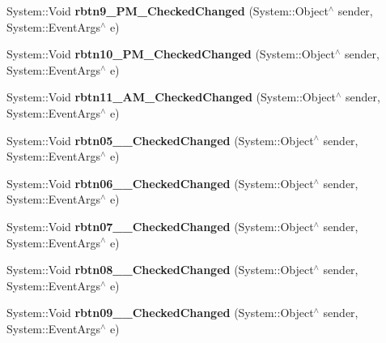 \begin{DoxyCompactItemize}
\item 
\mbox{\label{class_project1_1_1_my_form_a5201cffc096739f227ed80b55209646f}} 
System\+::\+Void {\bfseries rbtn9\+\_\+P\+M\+\_\+\+Checked\+Changed} (System\+::\+Object$^\wedge$ sender, System\+::\+Event\+Args$^\wedge$ e)
\item 
\mbox{\label{class_project1_1_1_my_form_a123b5180ddc9c66b10e32208ba83459d}} 
System\+::\+Void {\bfseries rbtn10\+\_\+P\+M\+\_\+\+Checked\+Changed} (System\+::\+Object$^\wedge$ sender, System\+::\+Event\+Args$^\wedge$ e)
\item 
\mbox{\label{class_project1_1_1_my_form_a0be09c12ad3000de28c080a47d277fe8}} 
System\+::\+Void {\bfseries rbtn11\+\_\+A\+M\+\_\+\+Checked\+Changed} (System\+::\+Object$^\wedge$ sender, System\+::\+Event\+Args$^\wedge$ e)
\item 
\mbox{\label{class_project1_1_1_my_form_a195288ed661a820b0310e66f74e6c139}} 
System\+::\+Void {\bfseries rbtn05\+\_\+\_\+\+Checked\+Changed} (System\+::\+Object$^\wedge$ sender, System\+::\+Event\+Args$^\wedge$ e)
\item 
\mbox{\label{class_project1_1_1_my_form_a849d978ca357793868f71a0e8ec778f4}} 
System\+::\+Void {\bfseries rbtn06\+\_\+\_\+\+Checked\+Changed} (System\+::\+Object$^\wedge$ sender, System\+::\+Event\+Args$^\wedge$ e)
\item 
\mbox{\label{class_project1_1_1_my_form_a66eec6fa75d478c5d3af4d112f8a5e2b}} 
System\+::\+Void {\bfseries rbtn07\+\_\+\_\+\+Checked\+Changed} (System\+::\+Object$^\wedge$ sender, System\+::\+Event\+Args$^\wedge$ e)
\item 
\mbox{\label{class_project1_1_1_my_form_a0a78c1780468a5c8d57d863f512d460a}} 
System\+::\+Void {\bfseries rbtn08\+\_\+\_\+\+Checked\+Changed} (System\+::\+Object$^\wedge$ sender, System\+::\+Event\+Args$^\wedge$ e)
\item 
\mbox{\label{class_project1_1_1_my_form_a784003f91ea91b3d6711091451b00a1c}} 
System\+::\+Void {\bfseries rbtn09\+\_\+\_\+\+Checked\+Changed} (System\+::\+Object$^\wedge$ sender, System\+::\+Event\+Args$^\wedge$ e)

\end{DoxyCompactItemize}
